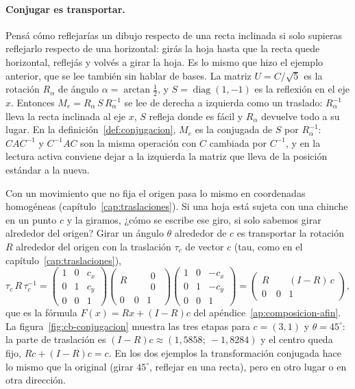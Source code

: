 \paragraph{Conjugar es transportar.} Pensá cómo reflejarías un dibujo respecto de una recta
inclinada si solo supieras reflejarlo respecto de una horizontal: girás la hoja hasta que la
recta quede horizontal, reflejás y volvés a girar la hoja. Es lo mismo que hizo el ejemplo
anterior, que se lee también sin hablar de bases.
La matriz \(U=C/\sqrt5\) es la rotación \(R_\alpha\) de ángulo \(\alpha=\arctan\tfrac12\), y
\(S=\operatorname{diag}(1,-1)\) es la reflexión en el eje \(x\). Entonces
\(M_e=R_\alpha\,S\,R_\alpha^{-1}\) se lee de derecha a izquierda como un traslado:
\(R_\alpha^{-1}\) lleva la recta inclinada al eje \(x\), \(S\) refleja donde es fácil y
\(R_\alpha\) devuelve todo a su lugar. En la definición~\ref{def:conjugacion}, \(M_e\) es la
conjugada de \(S\) por \(R_\alpha^{-1}\): \(CAC^{-1}\) y \(C^{-1}AC\) son la misma operación
con \(C\) cambiada por \(C^{-1}\), y en la lectura activa conviene dejar a la izquierda la
matriz que lleva de la posición estándar a la nueva.

Con un movimiento que no fija el origen pasa lo mismo en coordenadas homogéneas
(capítulo~\ref{cap:traslaciones}). Si una hoja está sujeta con una chinche en un punto \(c\) y
la giramos, ¿cómo se escribe ese giro, si solo sabemos girar alrededor del origen? Girar un
ángulo \(\theta\) alrededor de \(c\) es
transportar la rotación \(R\) alrededor del origen con la traslación \(\tau_c\) de vector \(c\) (tau, como en el capítulo~\ref{cap:traslaciones}),
\[
  \tau_c\,R\,\tau_c^{-1}
  =\begin{pmatrix}1&0&c_x\\0&1&c_y\\0&0&1\end{pmatrix}
   \begin{pmatrix}R&\begin{matrix}0\\0\end{matrix}\\0\quad0&1\end{pmatrix}
   \begin{pmatrix}1&0&-c_x\\0&1&-c_y\\0&0&1\end{pmatrix}
  =\begin{pmatrix}R&(I-R)\,c\\0\quad0&1\end{pmatrix},
\]
que es la fórmula \(F(x)=Rx+(I-R)c\) del apéndice~\ref{ap:composicion-afin}. La
figura~\ref{fig:cb-conjugacion} muestra las tres etapas para \(c=(3,1)\) y \(\theta=45^\circ\):
la parte de traslación es \((I-R)c\approx(1{,}5858;\ -1{,}8284)\) y el centro queda fijo,
\(Rc+(I-R)c=c\). En los dos ejemplos la transformación conjugada hace lo mismo que la original
(girar \(45^\circ\), reflejar en una recta), pero en otro lugar o en otra dirección.

